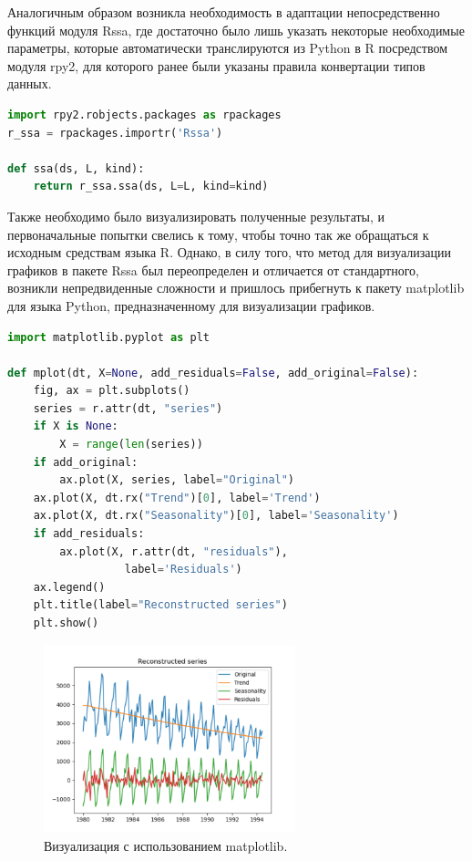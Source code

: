 \documentclass[specialist,
			   substylefile = spbu_report.rtx,
			   subf,href,colorlinks=true, 12pt]{disser}
\begin{document}
Аналогичным образом возникла необходимость в адаптации непосредственно функций модуля Rssa, где достаточно было лишь указать некоторые необходимые параметры, которые автоматически транслируются из Python в R посредством модуля rpy2, для которого ранее были указаны правила конвертации типов данных. 

\begin{lstlisting}[language=Python, caption=Адаптация к модулю Rssa.]
import rpy2.robjects.packages as rpackages
r_ssa = rpackages.importr('Rssa')

def ssa(ds, L, kind):
	return r_ssa.ssa(ds, L=L, kind=kind)
\end{lstlisting}

Также необходимо было визуализировать полученные результаты, и первоначальные попытки свелись к тому, чтобы точно так же обращаться к исходным средствам языка R. Однако, в силу того, что метод для визуализации графиков в пакете Rssa был переопределен и отличается от стандартного, возникли непредвиденные сложности и пришлось прибегнуть к пакету matplotlib \cite{matplotlib-doc} для языка Python, предназначенному для визуализации графиков. 

\noindent
\begin{minipage}{\linewidth}
\begin{lstlisting}[language=Python, caption=Визуализация с помощью matplotlib.]
import matplotlib.pyplot as plt

def mplot(dt, X=None, add_residuals=False, add_original=False):
	fig, ax = plt.subplots()
	series = r.attr(dt, "series")
	if X is None:
		X = range(len(series))
	if add_original:
		ax.plot(X, series, label="Original")
	ax.plot(X, dt.rx("Trend")[0], label='Trend')
	ax.plot(X, dt.rx("Seasonality")[0], label='Seasonality')
	if add_residuals:
		ax.plot(X, r.attr(dt, "residuals"), 
                  label='Residuals')
	ax.legend()
	plt.title(label="Reconstructed series")
	plt.show()
\end{lstlisting}
\end{minipage}

\begin{figure}[htp]
	\centering
	\includegraphics[width=0.65\textwidth]{py_plot_1}
	\caption{Визуализация с использованием matplotlib.}
	\label{fig:graph2}
\end{figure}
\end{document}
